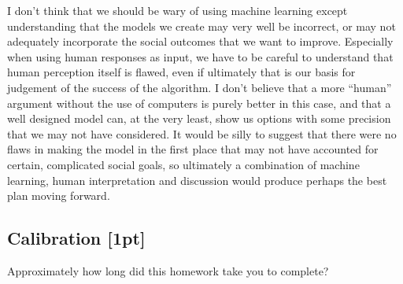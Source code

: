 \documentclass[submit]{harvardml}
\begin{document}
I don't think that we should be wary of using machine learning except
understanding that the models we create may very well be incorrect, or may not
adequately incorporate the social outcomes that we want to improve. Especially
when using human responses as input, we have to be careful to understand that
human perception itself is flawed, even if ultimately that is our basis for
judgement of the success of the algorithm. I don't believe that a more
``human'' argument without the use of computers is purely better in this case,
and that a well designed model can, at the very least, show us options with
some precision that we may not have considered. It would be silly to suggest
that there were no flaws in making the model in the first place that may not
have accounted for certain, complicated social goals, so ultimately a
combination of machine learning, human interpretation and discussion would
produce perhaps the best plan moving forward.

\newpage

\subsection*{Calibration [1pt]}
Approximately how long did this homework take you to complete?
\end{document}
